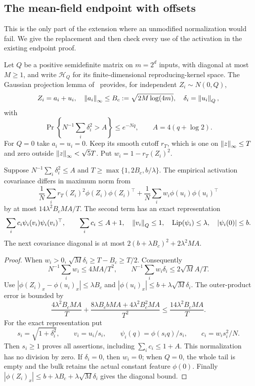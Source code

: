 \subsection{The mean-field endpoint with offsets}
This is the only part of the extension where an unmodified normalization
would fail. We give the replacement and then check every use of the
activation in the existing endpoint proof.

Let $Q$ be a positive semidefinite matrix on $m=2^d$ inputs, with diagonal
at most $M\ge1$, and write $\mathcal H_Q$ for its finite-dimensional
reproducing-kernel space. The Gaussian projection lemma of~\cite{lipschitz}
provides, for independent $Z_i\sim N(0,Q)$,
\[
 Z_i=a_i+u_i,\quad \left\lVert a_i\right\rVert_\infty\le B_c:=\sqrt{2M\log(4m)},
 \quad \delta_i=\left\lVert u_i\right\rVert_Q,
\]
with
\[
 \Pr\left\{N^{-1}\sum_i\delta_i^2>A\right\}\le e^{-Nq},
 \qquad A=4(q+\log2).
\]
For $Q=0$ take $a_i=u_i=0$. Keep its smooth cutoff $r_T$, which is one
on $\left\lVert z\right\rVert_\infty\le T$ and zero outside $\left\lVert z\right\rVert_\infty<\sqrt5T$.
Put $w_i=1-r_T(Z_i)^2$.

\begin{lemma}\label{lem:offset-atoms}
Suppose $N^{-1}\sum_i\delta_i^2\le A$ and
$T\ge\max\{1,2B_c,b/\lambda\}$. The empirical activation covariance
differs in maximum norm from
\[
 \frac1N\sum_i r_T(Z_i)^2\phi(Z_i)\phi(Z_i)^\top
 +\frac1N\sum_i w_i\phi(u_i)\phi(u_i)^\top
\]
by at most $14\lambda^2B_cMA/T$. The second term has an exact representation
\[
 \sum_i c_i\psi_i(v_i)\psi_i(v_i)^\top,\qquad
 \sum_i c_i\le A+1,\quad \left\lVert v_i\right\rVert_Q\le1,
 \quad \operatorname{Lip}(\psi_i)\le\lambda,\quad |\psi_i(0)|\le b.
\]
The next covariance diagonal is at most
$2(b+\lambda B_c)^2+2\lambda^2MA$.
\end{lemma}
\begin{proof}
When $w_i>0$, $\sqrt M\delta_i\ge T-B_c\ge T/2$. Consequently
\[
 N^{-1}\sum_iw_i\le4MA/T^2,\qquad
 N^{-1}\sum_iw_i\delta_i\le2\sqrt M A/T.
\]
Use $|\phi(Z_i)_x-\phi(u_i)_x|\le\lambda B_c$ and
$|\phi(u_i)_x|\le b+\lambda\sqrt M\delta_i$. The outer-product error is
bounded by
\[
 \frac{4\lambda^2B_cMA}{T}
 +\frac{8\lambda B_cbMA+4\lambda^2B_c^2MA}{T^2}
 \le\frac{14\lambda^2B_cMA}{T}.
\]
For the exact representation put
\[
 s_i=\sqrt{1+\delta_i^2},\qquad v_i=u_i/s_i,\qquad
 \psi_i(q)=\phi(s_iq)/s_i,\qquad c_i=w_is_i^2/N.
\]
Then $s_i\ge1$ proves all assertions, including
$\sum_i c_i\le1+A$. This normalization has no division by zero.
If $\delta_i=0$, then $w_i=0$; when $Q=0$, the whole tail is empty and
the bulk retains the actual constant feature $\phi(0)$.
Finally $|\phi(Z_i)_x|\le b+\lambda B_c+\lambda\sqrt M\delta_i$ gives
the diagonal bound.
\end{proof}

